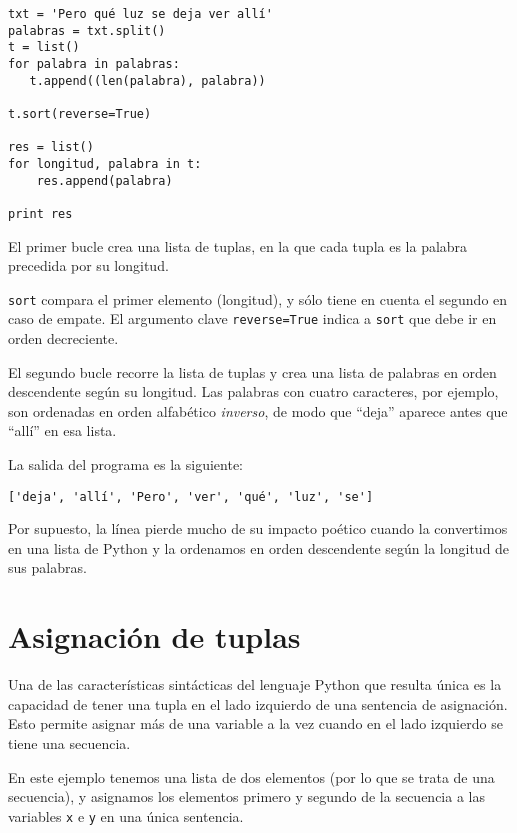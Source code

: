 \beforeverb
\begin{verbatim}
txt = 'Pero qué luz se deja ver allí'
palabras = txt.split()
t = list()
for palabra in palabras:
   t.append((len(palabra), palabra))

t.sort(reverse=True)

res = list()
for longitud, palabra in t:
    res.append(palabra)

print res
\end{verbatim}
\afterverb
%
El primer bucle crea una lista de tuplas, en la que cada
tupla es la palabra precedida por su longitud.

{\tt sort} compara el primer elemento (longitud), y
sólo tiene en cuenta el segundo en caso de empate. El argumento
clave {\tt reverse=True} indica a {\tt sort} que debe ir en orden decreciente.


El segundo bucle recorre la lista de tuplas y crea una lista de
palabras en orden descendente según su longitud. Las palabras con cuatro caracteres,
por ejemplo, son ordenadas en orden alfabético {\em inverso}, de modo que
``deja'' aparece antes que ``allí'' en esa lista.

La salida del programa es la siguiente:
%
\beforeverb
\begin{verbatim}
['deja', 'allí', 'Pero', 'ver', 'qué', 'luz', 'se']
\end{verbatim}
\afterverb
%
Por supuesto, la línea pierde mucho de su impacto poético
cuando la convertimos en una lista de Python y la ordenamos
en orden descendente según la longitud de sus palabras.

\section{Asignación de tuplas}
\label{tuple assignment}


Una de las características sintácticas del lenguaje Python que resulta única
es la capacidad de tener una tupla en el lado
izquierdo de una sentencia de asignación. Esto permite asignar
más de una variable a la vez cuando en el lado izquierdo se tiene
una secuencia.

En este ejemplo tenemos una lista de dos elementos (por lo que se trata de una secuencia), y
asignamos los elementos primero y segundo de la secuencia
a las variables {\tt x} e {\tt y} en una única sentencia.

